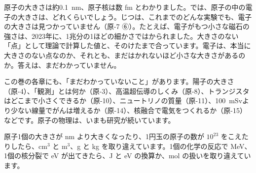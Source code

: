 \begin{phmada}
原子の大きさは約\qty{0.1}{nm}、原子核は数 fm とわかりました。では、原子の中の電子の大きさは、どれくらいでしょう。じつは、これまでのどんな実験でも、電子の大きさは見つかっていません（原-7 ⑥）。たとえば、電子がもつ小さな磁石の強さは、2023年に、1兆分の1ほどの細かさではかられました。大きさのない「点」として理論で計算した値と、そのけたまで合っています。電子は、本当に大きさのない点なのか、それとも、まだはかれないほど小さな大きさがあるのか。答えは、まだわかっていません。\par\vspace{2pt}
この巻の各章にも、「まだわかっていないこと」があります。陽子の大きさ（原-4）、「観測」とは何か（原-3）、高温超伝導のしくみ（原-8）、トランジスタはどこまで小さくできるか（原-10）、ニュートリノの質量（原-11）、\qty{100}{mSv}より少ない線量でがんは増えるか（原-14）、核融合で電気をつくれるか（原-15）などです。原子の物理は、いまも研究が続いています。
\end{phmada}

\begin{phketa}[原子の数とエネルギーの目安]
原子1個の大きさが nm より大きくなったり、1円玉の原子の数が $10^{23}$ をこえたりしたら、cm$^3$ と m$^3$、g と kg を取り違えています。1個の化学の反応で MeV、1個の核分裂で eV が出てきたら、J と eV の換算か、mol の扱いを取り違えています。
\end{phketa}

\begin{kotoba}\small
{}
\end{kotoba}

